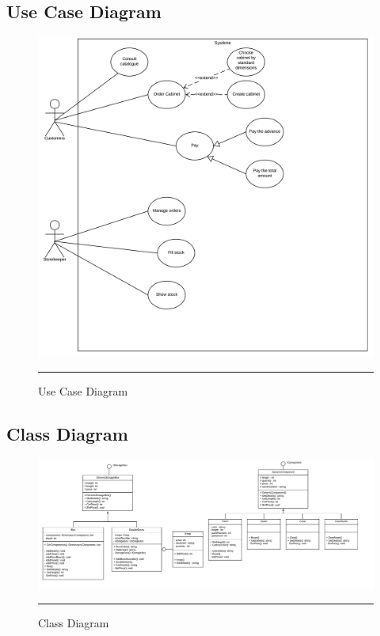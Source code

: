     \subsection{Use Case Diagram}
        \vfill
        \begin{figure}[h!]
            \centering
			\includegraphics[width =\textwidth]{Figures/UseCaseDiagram.png}
			\rule{35em}{0.5pt}
			\caption{Use Case Diagram}
			\label{usecasediagram}
    	\end{figure}
        \vfill
        
    \newpage
    \subsection{Class Diagram}
        \begin{figure}[h!]
            \centering
			\includegraphics[width = 1.3\textwidth,angle = 90]{Figures/ClassDiagram-1.png}
			\rule{35em}{0.5pt}
			\caption{Class Diagram}
			\label{classdiagram}
    	\end{figure}
    
